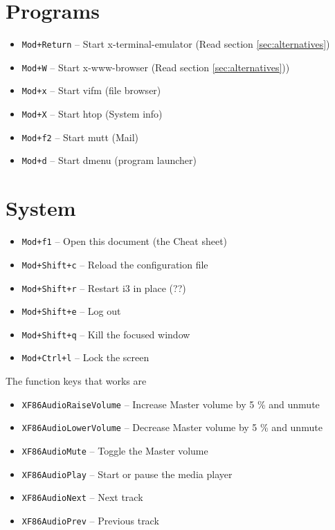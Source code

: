 \documentclass{article}
\begin{document}
\section*{Programs}
\begin{itemize}
	\item \verb|Mod+Return| -- Start x-terminal-emulator (Read section \ref{sec:alternatives})
	\item \verb|Mod+W| -- Start x-www-browser (Read section \ref{sec:alternatives}))
	\item \verb|Mod+x| -- Start vifm (file browser)
	\item \verb|Mod+X| -- Start htop (System info)
	\item \verb|Mod+f2| -- Start mutt (Mail)
	\item \verb|Mod+d| -- Start dmenu (program launcher)
\end{itemize}

\section*{System}
\begin{itemize}
	\item \verb|Mod+f1| -- Open this document (the Cheat sheet)
	\item \verb|Mod+Shift+c| -- Reload the configuration file
	\item \verb|Mod+Shift+r| -- Restart i3 in place (??)
	\item \verb|Mod+Shift+e| -- Log out
	\item \verb|Mod+Shift+q| -- Kill the focused window
	\item \verb|Mod+Ctrl+l| -- Lock the screen
\end{itemize}

The function keys that works are 
\begin{itemize}
	\item \verb|XF86AudioRaiseVolume| -- Increase Master volume by 5 \% and unmute
	\item \verb|XF86AudioLowerVolume| -- Decrease Master volume by 5 \% and unmute
	\item \verb|XF86AudioMute| -- Toggle the Master volume
	\item \verb|XF86AudioPlay| -- Start or pause the media player 
	\item \verb|XF86AudioNext| -- Next track  
	\item \verb|XF86AudioPrev| -- Previous track  
\end{itemize}
\end{document}
